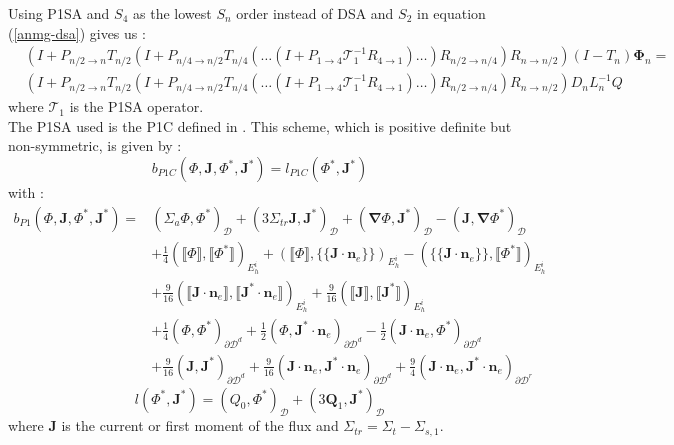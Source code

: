 \documentclass[preprint,10pt]{elsarticle}
\newcommand\bn{\boldsymbol{\nabla}}
\newcommand\bs{\boldsymbol}
\newcommand\ldb{\{\!\!\{}
\newcommand\rdb{\}\!\!\}}
\newcommand\llb{\llbracket}
\newcommand\rrb{\rrbracket}
\renewcommand{\(}{\left(}
\renewcommand{\)}{\right)}
\renewcommand{\[}{\left[}
\renewcommand{\]}{\right]}
\begin{document}
Using P1SA and $S_4$ as the lowest $S_n$ order instead of DSA and $S_2$ in 
equation (\ref{anmg-dsa}) gives us :
\begin{equation}
\begin{split}
& (I+P_{n/2\rightarrow n} T_{n/2} (I+P_{n/4\rightarrow n/2}
T_{n/4}(\hdots(I+P_{1\rightarrow 4}\mathcal{T}_1^{-1} R_{4\rightarrow
1})\hdots)R_{n/2 \rightarrow n/4})R_{n\rightarrow n/2}) (I-T_n)\bs{\Phi}_n = \\
& (I+P_{n/2\rightarrow n} T_{n/2} (I+P_{n/4\rightarrow n/2}
T_{n/4}(\hdots(I+P_{1\rightarrow 4}\mathcal{T}_1^{-1} R_{4\rightarrow
1})\hdots)R_{n/2\rightarrow n/4})R_{n\rightarrow n/2}) D_n L_n^{-1} Q
\end{split}
\end{equation}
where $\mathcal{T}_1$ is the P1SA operator.\\
The P1SA used is the P1C defined in \cite{yaqi}. This scheme,
which is positive definite but non-symmetric, is given by :
\begin{equation}
b_{P1C}(\Phi,\bs{J},\Phi^*,\bs{J}^*) = l_{P1C}(\Phi^*,\bs{J}^*)
\end{equation}
with :
\begin{equation}
\begin{split}
b_{P1}(\Phi,\bs{J},\Phi^*,\bs{J}^*) = & (\Sigma_a \Phi,\Phi^*)_{\mathcal{D}} +
(3\Sigma_{tr} \bs{J},\bs{J}^*)_{\mathcal{D}} + (\bn
\Phi,\bs{J}^*)_{\mathcal{D}} - (\bs{J},\bn \Phi^*)_{\mathcal{D}}\\
&+\frac{1}{4} \(\llb\Phi\rrb,\llb\Phi^*\rrb\)_{E_h^i} +
\(\llb\Phi\rrb,\ldb\bs{J}\cdot\bs{n}_e\rdb\)_{E_h^i} - (\ldb
\bs{J}\cdot\bs{n}_e\rdb, \llb\Phi^*\rrb)_{E_h^i}\\
&+\frac{9}{16}\(\llb\bs{J}\cdot\bs{n}_e\rrb,\llb\bs{J}^*\cdot\bs{n}_e\rrb\)_{E_h^i}
+ \frac{9}{16}\(\llb\bs{J}\rrb,\llb\bs{J}^*\rrb\)_{E_h^i}\\
&+\frac{1}{4}(\Phi,\Phi^*)_{\partial \mathcal{D}^d} +
\frac{1}{2}(\Phi,\bs{J}^*\cdot\bs{n}_e)_{\partial \mathcal{D}^d} - \frac{1}{2}
(\bs{J}\cdot\bs{n}_e,\Phi^*)_{\partial\mathcal{D}^d}\\
&+\frac{9}{16}(\bs{J},\bs{J}^*)_{\partial
\mathcal{D}^d}+\frac{9}{16}(\bs{J}\cdot\bs{n}_e,\bs{J}^*\cdot\bs{n}_e)_{\partial 
\mathcal{D}^d} + \frac{9}{4} (\bs{J}\cdot\bs{n}_e,\bs{J}^*\cdot\bs{n}_e)_{\partial
\mathcal{D}^r}
\end{split}
\end{equation}
\begin{equation}
l(\Phi^*,\bs{J}^*) = (Q_0,\Phi^*)_{\mathcal{D}} +
(3\bs{Q}_1,\bs{J}^*)_{\mathcal{D}}
\end{equation}
where $\bs{J}$ is the current or first moment of the flux and 
$\Sigma_{tr}=\Sigma_t-\Sigma_{s,1}$.
\end{document}
